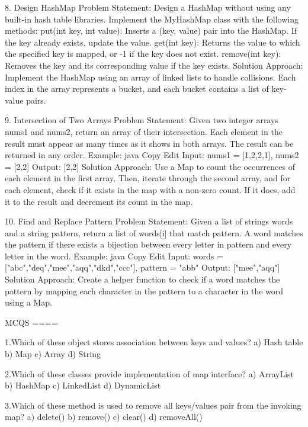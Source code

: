 {8.
Design HashMap
Problem Statement:
Design a HashMap without using any built-in hash table libraries. Implement the MyHashMap class with the following methods:
put(int key, int value): Inserts a (key, value) pair into the HashMap. If the key already exists, update the value.
get(int key): Returns the value to which the specified key is mapped, or -1 if the key does not exist.
remove(int key): Removes the key and its corresponding value if the key exists.
Solution Approach:
Implement the HashMap using an array of linked lists to handle collisions. Each index in the array represents a bucket, and each bucket contains a 
list of key-value pairs.


9.
Intersection of Two Arrays
Problem Statement:
Given two integer arrays nums1 and nums2, return an array of their intersection. Each element in the result must appear as many times as it shows 
in both arrays. The result can be returned in any order.
Example:
java
Copy
Edit
Input: nums1 = [1,2,2,1], nums2 = [2,2]
Output: [2,2]
Solution Approach:
Use a Map to count the occurrences of each element in the first array. Then, iterate through the second array, and for each element, check if it 
exists in the map with a non-zero count. If it does, add it to the result and decrement its count in the map.


10.
Find and Replace Pattern
Problem Statement:
Given a list of strings words and a string pattern, return a list of words[i] that match pattern. A word matches the pattern if there exists a 
bijection between every letter in pattern and every letter in the word.
Example:
java
Copy
Edit
Input: words = ["abc","deq","mee","aqq","dkd","ccc"], pattern = "abb"
Output: ["mee","aqq"]
Solution Approach:
Create a helper function to check if a word matches the pattern by mapping each character in the pattern to a character in the word using a Map.












MCQS
====

1.Which of these object stores association between keys and values?
a) Hash table
b) Map
c) Array
d) String

2.Which of these classes provide implementation of map interface?
a) ArrayList
b) HashMap
c) LinkedList
d) DynamicList

3.Which of these method is used to remove all keys/values pair from the invoking map?
a) delete()
b) remove()
c) clear()
d) removeAll()

}
